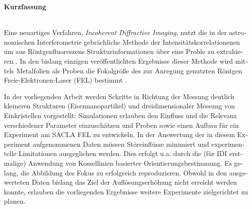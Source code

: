  \begin{otherlanguage}{german}
 \begin{Huge}
 	\textbf{Kurzfassung}\vspace{12mm}
 \end{Huge}
\\
Eine neuartiges Verfahren, \textit{Incoherent Diffractive Imaging}, nutzt die in der astronomischen Interferometrie gebrächliche Methode der Intensitätskorrelationenen um aus Röntgenfluoreszens Strukturinformationen über eine Proble zu extrahieren \cite{classen2017}.  
In den bislang einzigen veröffentlichten Ergebnisse dieser Methode wird mittels Metalfolien als Proben die Fokalgröße des zur Anregung genutzten Röntgen Freie-Elektronen-Laser (FEL) bestimmt \cite{nakumura2020}.

In der vorliegenden Arbeit werden Schritte in Richtung der Messung deutlich kleineren Strukturen (Eisennanopartikel) und dreidimensionaler Messung von Einkristellen vorgestellt: Simulationen erlauben den Einfluss und die Relevanz verschiedener Parameter einzuschätzen und Proben sowie einen Aufbau für ein Experiment am SACLA FEL zu entwickeln. In der Auswertung der in diesem Experiment aufgenommenen Daten müssen Störeinflüsse minimiert und experimentelle Limitationen ausgeglichen werden. Dies erfolgt u.a. durch die (für IDI erstmalige) Anwendung von Kossellinien basierter Orientierungsbestimmung.  
Es gelang, die Abbildung des Fokus zu erfolgreich reproduzieren.  Obwohl in den ausgewerteten Daten bislang das Ziel der Auflösungserhöhung nicht erreicht werden konnte, erlauben die vorliegenden Ergebnisse weitere Experimente zielgerichtet zu planen.
\end{otherlanguage}